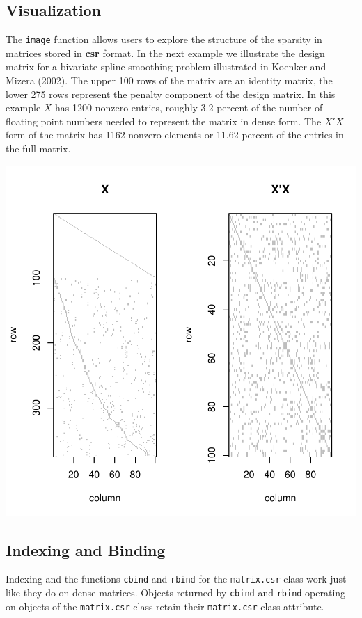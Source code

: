 \documentclass{article}
\begin{document}
\subsection{Visualization}
The \texttt{image} function allows users to explore the
structure of the sparsity in matrices stored in \textbf{csr} format.
In the next example we illustrate the design matrix for a bivariate
spline smoothing problem illustrated in Koenker and Mizera (2002).  The
upper 100 rows of the matrix are an identity matrix, the lower 275 rows
represent the penalty component of the design matrix.  In this example $X$
has 1200 nonzero entries, roughly 3.2 percent of the number of floating
point numbers needed to represent the matrix in dense form.  The $X'X$ form
of the matrix has 1162 nonzero elements or  11.62 percent of the entries
in the full matrix.  

\begin{center}
\includegraphics{SparseM-002}
\end{center}

\subsection{Indexing and Binding}

Indexing and the functions \texttt{cbind} and \texttt{rbind} for the
\texttt{matrix.csr} class work just like they do on dense matrices. 
Objects returned by \texttt{cbind} and \texttt{rbind} operating 
on objects of the \texttt{matrix.csr} class retain their 
\texttt{matrix.csr} class attribute.
\end{document}
